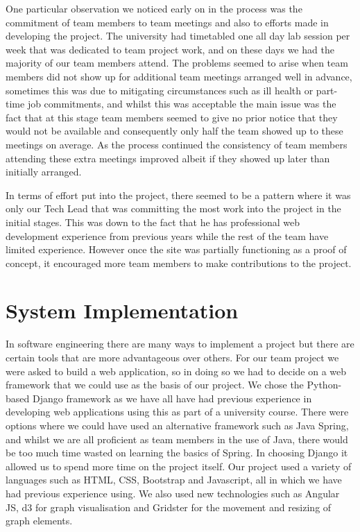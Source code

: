 \documentclass{l3proj}
\begin{document}
One particular observation we noticed early on in the process was the commitment of team members to team meetings and also
to efforts made in developing the project. The university had timetabled one all day lab session per week that was dedicated
to team project work, and on these days we had the majority of our team members attend. The problems seemed to arise when
team members did not show up for additional team meetings arranged well in advance, sometimes this was due to mitigating
circumstances such as ill health or part-time job commitments, and whilst this was acceptable the main issue was the fact
that at this stage team members seemed to give no prior notice that they would not be available and consequently only
half the team showed up to these meetings on average. As the process continued the consistency of team members attending these
extra meetings improved albeit if they showed up later than initially arranged.

In terms of effort put into the project, there seemed to be a pattern where it was only our Tech Lead that was committing the most
work into the project in the initial stages. This was down to the fact that he has professional web development experience from previous
years while the rest of the team have limited experience. However once the site was partially functioning as a proof of concept, it
encouraged more team members to make contributions to the project.




\section{System Implementation}
\label{sec:system-implementation}

In software engineering there are many ways to implement a project but there are certain tools that are more advantageous over
others. For our team project we were asked to build a web application, so in doing so we had to decide on a web framework that
we could use as the basis of our project. We chose the Python-based Django framework as we have all have had previous experience
in developing web applications using this as part of a university course. There were options where we could have used an alternative
framework such as Java Spring, and whilst we are all proficient as team members in the use of Java, there would be too much time
wasted on learning the basics of Spring. In choosing Django it allowed us to spend more time on the project itself. Our project
used a variety of languages such as HTML, CSS, Bootstrap and Javascript, all in which we have had previous experience using.
We also used new technologies such as Angular JS, d3 for graph visualisation and Gridster for the movement and resizing of graph
elements.
\end{document}
